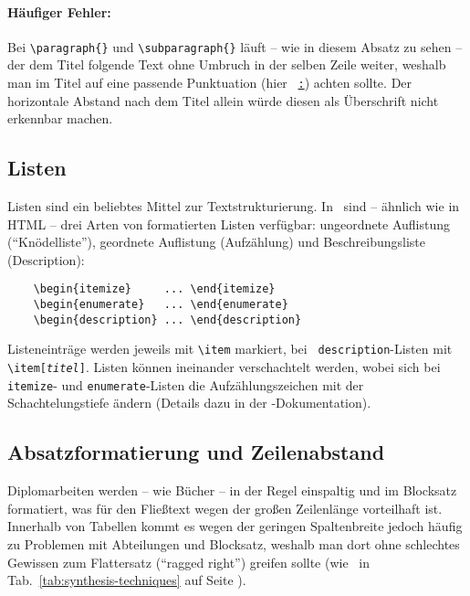 \paragraph{Häufiger Fehler:} Bei \verb!\paragraph{}! und
\verb!\subparagraph{}! läuft -- wie in diesem Absatz zu sehen --
der dem Titel folgende Text ohne Umbruch in der selben Zeile
weiter, weshalb man im Titel auf eine passende Punktuation (hier
\zB\ \underline{\texttt{:}}) achten sollte. Der horizontale Abstand
nach dem Titel allein würde diesen als Überschrift nicht erkennbar
machen.


\subsection{Listen}

Listen sind ein beliebtes Mittel zur Textstrukturierung. In
\latex\ sind -- ähnlich wie in HTML -- drei Arten von formatierten
Listen verfügbar: ungeordnete Auflistung ("`Knödelliste"'),
geordnete Auflistung (Aufzählung) und Beschreibungsliste
(Description):
%
\begin{verbatim}
    \begin{itemize}     ... \end{itemize}
    \begin{enumerate}   ... \end{enumerate}
    \begin{description} ... \end{description}
\end{verbatim}
%
Listeneinträge werden jeweils mit \verb!\item! markiert, bei {\tt
description}-Listen mit \verb!\item[!\texttt{\em titel}\verb!]!. Listen
können ineinander verschachtelt werden, wobei sich bei {\tt
itemize}- und \texttt{enumerate}-Listen die Aufzählungszeichen mit
der Schachtelungstiefe ändern (Details dazu in der
\latex-Dokumentation).


\subsection{Absatzformatierung und Zeilenabstand}

Diplomarbeiten werden -- wie Bücher -- in der Regel einspaltig und
im Blocksatz formatiert, was für den Fließtext wegen der großen
Zeilenlänge vorteilhaft ist. Innerhalb von Tabellen kommt es
wegen der geringen Spaltenbreite jedoch häufig zu Problemen mit
Abteilungen und Blocksatz, weshalb man dort ohne schlechtes
Gewissen zum Flattersatz ("`ragged right"') greifen sollte (wie
\zB\ in Tab.~\ref{tab:synthesis-techniques} auf Seite
\pageref{tab:synthesis-techniques}).

